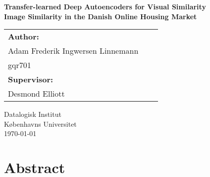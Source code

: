 \documentclass[a4paper]{article}
\begin{document}
	\AddToShipoutPicture*{\BackgroundPic}
	\begin{titlepage}
		\thispagestyle{empty}
		\vspace*{5cm}
		\begin{center}
			\Huge \textbf{Transfer-learned Deep Autoencoders for Visual Similarity} \\
      \LARGE \textbf{Image Similarity in the Danish Online Housing Market} \\
		\end{center}
		\vspace*{3.5cm}
		\begin{flushleft}

		\begin{table}[h!]
			\begin{tabular}{lll}	
	  \textbf{Author:} \\  Adam Frederik Ingwersen Linnemann \\ gqr701 \\ 
	  \textbf{Supervisor:} \\ Desmond Elliott 
			\end{tabular}
		\end{table}
			\vspace{3mm}
			\vspace{3mm}
			Datalogisk  Institut\\
			Københavns Universitet\\
			\vspace{3mm}
			\today\\

		\end{flushleft}
	\end{titlepage}

	\title{}
	\author{}

	\newpage
\newpage

\setAssignment{}
\setCourse{}

\setcounter{secnumdepth}{4}
\setcounter{tocdepth}{2}
\tableofcontents

\newpage

\section*{Abstract}

\end{document}
